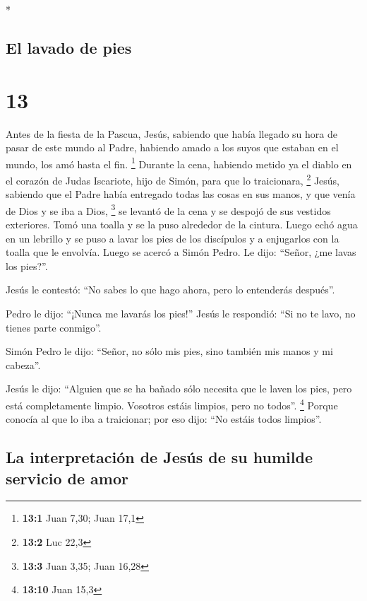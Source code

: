 \begin{paracol}{2}
\begin{otherlanguage}{english}
\end{otherlanguage}

\switchcolumn[0]*

\hypertarget{el-lavado-de-pies}{%
\subsection{El lavado de pies}\label{el-lavado-de-pies}}

\hypertarget{section-24}{%
\section{13}\label{section-24}}

 Antes de la fiesta de la Pascua, Jesús, sabiendo que
había llegado su hora de pasar de este mundo al Padre, habiendo amado a
los suyos que estaban en el mundo, los amó hasta el fin. \footnote{\textbf{13:1}
  Juan 7,30; Juan 17,1}  Durante la cena, habiendo metido
ya el diablo en el corazón de Judas Iscariote, hijo de Simón, para que
lo traicionara, \footnote{\textbf{13:2} Luc 22,3}  Jesús,
sabiendo que el Padre había entregado todas las cosas en sus manos, y
que venía de Dios y se iba a Dios, \footnote{\textbf{13:3} Juan 3,35;
  Juan 16,28}  se levantó de la cena y se despojó de sus
vestidos exteriores. Tomó una toalla y se la puso alrededor de la
cintura.  Luego echó agua en un lebrillo y se puso a lavar
los pies de los discípulos y a enjugarlos con la toalla que le envolvía.
 Luego se acercó a Simón Pedro. Le dijo: ``Señor, ¿me
lavas los pies?''.

 Jesús le contestó: ``No sabes lo que hago ahora, pero lo
entenderás después''.

 Pedro le dijo: ``¡Nunca me lavarás los pies!'' Jesús le
respondió: ``Si no te lavo, no tienes parte conmigo''.

 Simón Pedro le dijo: ``Señor, no sólo mis pies, sino
también mis manos y mi cabeza''.

 Jesús le dijo: ``Alguien que se ha bañado sólo necesita
que le laven los pies, pero está completamente limpio. Vosotros estáis
limpios, pero no todos''. \footnote{\textbf{13:10} Juan 15,3}
 Porque conocía al que lo iba a traicionar; por eso dijo:
``No estáis todos limpios''.

\hypertarget{la-interpretaciuxf3n-de-jesuxfas-de-su-humilde-servicio-de-amor}{%
\subsection{La interpretación de Jesús de su humilde servicio de
amor}\label{la-interpretaciuxf3n-de-jesuxfas-de-su-humilde-servicio-de-amor}}


\end{paracol}
